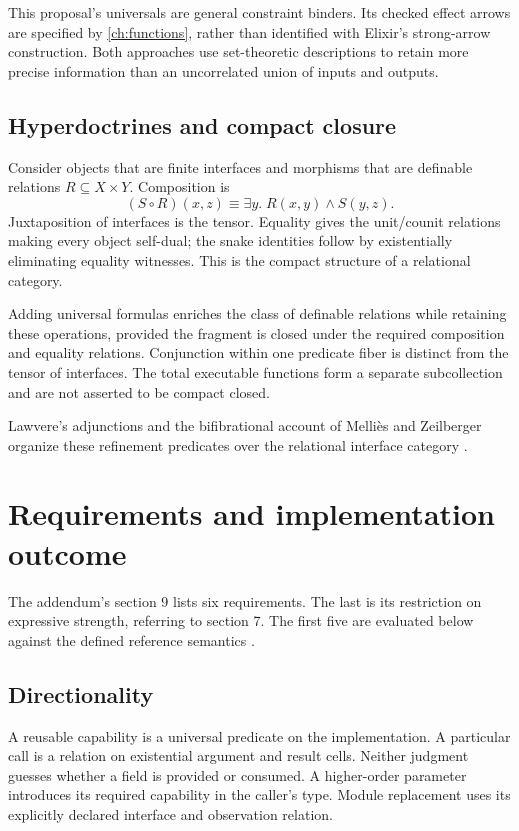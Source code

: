 \documentclass[11pt,a4paper,oneside]{report}
\theoremstyle{remark}
\begin{document}
This proposal's universals are general constraint binders. Its checked effect
arrows are specified by \cref{ch:functions}, rather than identified with Elixir's
strong-arrow construction. Both approaches use set-theoretic descriptions to
retain more precise information than an uncorrelated union of inputs and outputs.

\section{Hyperdoctrines and compact closure}
Consider objects that are finite interfaces and morphisms that are definable
relations $R\subseteq X\times Y$. Composition is
\[
 (S\circ R)(x,z)\equiv\exists y.\;R(x,y)\land S(y,z).
\]
Juxtaposition of interfaces is the tensor. Equality gives the unit/counit
relations making every object self-dual; the snake identities follow by
existentially eliminating equality witnesses. This is the compact structure of
a relational category.

Adding universal formulas enriches the class of definable relations while
retaining these operations, provided the fragment is closed under the required
composition and equality relations. Conjunction within one predicate fiber is
distinct from the tensor of interfaces. The total executable functions form a
separate subcollection and are not asserted to be compact closed.

Lawvere's adjunctions and the bifibrational account of Melli\`es and Zeilberger
organize these refinement predicates over the relational interface category
\cite{lawvere,mellies}.

\chapter{Requirements and implementation outcome}
\label{ch:requirements}
The addendum's section 9 lists six requirements. The last is its restriction on
expressive strength, referring to section 7. The first five are evaluated below
against the defined reference semantics \cite{cueaddendum}.

\section{Directionality}
A reusable capability is a universal predicate on the implementation. A
particular call is a relation on existential argument and result cells. Neither
judgment guesses whether a field is provided or consumed. A higher-order
parameter introduces its required capability in the caller's type. Module
replacement uses its explicitly declared interface and observation relation.
\end{document}

